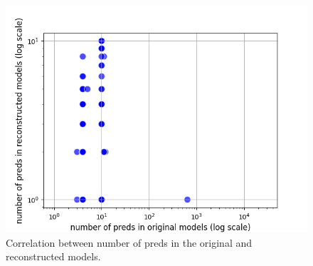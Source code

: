 \documentclass[conference]{IEEEtran}
\begin{document}
    
    \begin{figure}[htbp]
    \centerline{\includegraphics[width=\linewidth]{"./Correlation between number of preds in the original and reconstructed models.png"}}
    \caption{Correlation between number of preds in the original and reconstructed models.}
    \label{fig}
    \end{figure}
\end{document}
